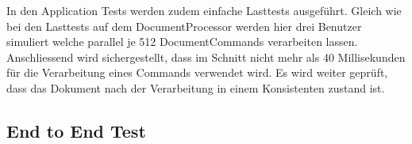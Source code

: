 In den Application Tests werden zudem einfache Lasttests ausgeführt.
Gleich wie bei den Lasttests auf dem DocumentProcessor werden hier drei Benutzer simuliert welche parallel je 512 DocumentCommands verarbeiten lassen.
Anschliessend wird sichergestellt, dass im Schnitt nicht mehr als 40 Millisekunden für die Verarbeitung eines Commands verwendet wird.
Es wird weiter geprüft, dass das Dokument nach der Verarbeitung in einem Konsistenten zustand ist.



\subsection{End to End Test}
